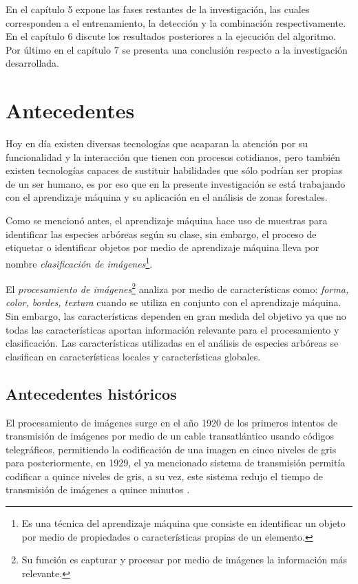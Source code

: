 En el capítulo 5 expone las fases restantes de la investigación, las cuales corresponden a el entrenamiento, la detección y la combinación respectivamente.\\
En el capítulo 6 discute los resultados posteriores a la ejecución del algoritmo. Por último en el capítulo 7 se presenta una conclusión respecto a la investigación desarrollada.

\chapter{Antecedentes}
Hoy en día existen diversas tecnologías que acaparan la atención por su funcionalidad y la interacción que tienen con procesos cotidianos, pero también existen tecnologías capaces de sustituir habilidades que sólo podrían ser propias de un ser humano, es por eso que en la presente investigación se está trabajando con el aprendizaje máquina y su aplicación en el análisis de zonas forestales.

Como se mencionó antes, el aprendizaje máquina hace uso de muestras para identificar las especies arbóreas según su clase, sin embargo, el proceso de etiquetar o identificar objetos por medio de aprendizaje máquina lleva por nombre \emph{clasificación de imágenes}\footnote{Es una técnica del aprendizaje máquina que consiste en identificar un objeto por medio de propiedades o características propias de un elemento.}.

El \emph{procesamiento de imágenes}\footnote{Su función es capturar y procesar por medio de imágenes la información más relevante.} analiza por medio de características como: \emph{forma, color, bordes, textura} cuando se utiliza en conjunto con el aprendizaje máquina. Sin embargo, las características dependen en gran medida del objetivo ya que no todas las características aportan información relevante para el procesamiento y clasificación. Las características utilizadas en el análisis de especies arbóreas se clasifican en características locales y características globales.

\section{Antecedentes históricos}
El procesamiento de imágenes surge en el año 1920 de los primeros intentos de transmisión de imágenes por medio de un cable transatlántico usando códigos telegráficos, permitiendo la codificación de una imagen en cinco niveles de gris para posteriormente, en 1929, el ya mencionado sistema de transmisión permitía codificar a quince niveles de gris, a su vez, este sistema redujo el tiempo de transmisión de imágenes a quince minutos \citep{rf4}. 

